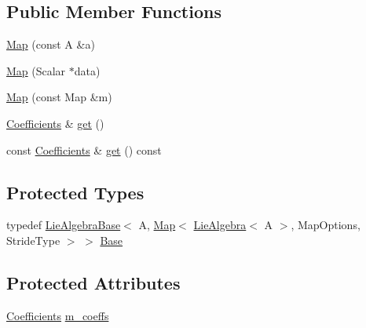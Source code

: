 \subsection*{Public Member Functions}
\begin{DoxyCompactItemize}
\item 
\hyperlink{class_map_3_01_lie_algebra_3_01_a_01_4_00_01_map_options_00_01_stride_type_01_4_a5e320dd14d4d47929d7a4d48014a735f}{Map} (const A \&a)
\item 
\hyperlink{class_map_3_01_lie_algebra_3_01_a_01_4_00_01_map_options_00_01_stride_type_01_4_a5b5a1ddc1058c048c2c202bf3bfd4763}{Map} (Scalar $\ast$data)
\item 
\hyperlink{class_map_3_01_lie_algebra_3_01_a_01_4_00_01_map_options_00_01_stride_type_01_4_a1b4291648994b13392cdc11c4f4d3e2c}{Map} (const Map \&m)
\item 
\hyperlink{class_map_3_01_lie_algebra_3_01_a_01_4_00_01_map_options_00_01_stride_type_01_4_a32e1cab48693733071a98e9f558d4c82}{Coefficients} \& \hyperlink{class_map_3_01_lie_algebra_3_01_a_01_4_00_01_map_options_00_01_stride_type_01_4_af64b17af3736228001fb55f9ed16b5ce}{get} ()
\item 
const \hyperlink{class_map_3_01_lie_algebra_3_01_a_01_4_00_01_map_options_00_01_stride_type_01_4_a32e1cab48693733071a98e9f558d4c82}{Coefficients} \& \hyperlink{class_map_3_01_lie_algebra_3_01_a_01_4_00_01_map_options_00_01_stride_type_01_4_a01a271dce87d94d6fade1279d3f5686f}{get} () const
\end{DoxyCompactItemize}
\subsection*{Protected Types}
\begin{DoxyCompactItemize}
\item 
typedef \hyperlink{class_lie_algebra_base}{Lie\+Algebra\+Base}$<$ A, \hyperlink{class_map_3_01_lie_algebra_3_01_a_01_4_00_01_map_options_00_01_stride_type_01_4_a5e320dd14d4d47929d7a4d48014a735f}{Map}$<$ \hyperlink{class_lie_algebra}{Lie\+Algebra}$<$ A $>$, Map\+Options, Stride\+Type $>$ $>$ \hyperlink{class_map_3_01_lie_algebra_3_01_a_01_4_00_01_map_options_00_01_stride_type_01_4_a1f44b1c76739ca5f9a17c23109c32488}{Base}
\end{DoxyCompactItemize}
\subsection*{Protected Attributes}
\begin{DoxyCompactItemize}
\item 
\hyperlink{class_map_3_01_lie_algebra_3_01_a_01_4_00_01_map_options_00_01_stride_type_01_4_a32e1cab48693733071a98e9f558d4c82}{Coefficients} \hyperlink{class_map_3_01_lie_algebra_3_01_a_01_4_00_01_map_options_00_01_stride_type_01_4_ad9d42724afc3ed4f287a0a3f7a9de6e4}{m\+\_\+coeffs}
\end{DoxyCompactItemize}


